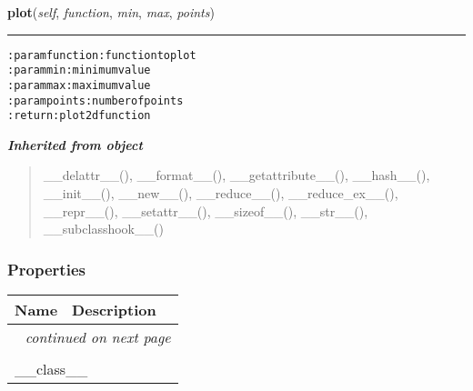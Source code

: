     \label{hal:charts:plotter:Plot2d:plot}

    \vspace{0.5ex}

\hspace{.8\funcindent}\begin{boxedminipage}{\funcwidth}

    \raggedright \textbf{plot}(\textit{self}, \textit{function}, \textit{min}, \textit{max}, \textit{points})

    \vspace{-1.5ex}

    \rule{\textwidth}{0.5\fboxrule}
\setlength{\parskip}{2ex}
\begin{alltt}

:param function: function to plot
:param min: minimum value
:param max: maximum value
:param points: number of points
:return: plot 2d function
\end{alltt}

\setlength{\parskip}{1ex}
    \end{boxedminipage}


\large{\textbf{\textit{Inherited from object}}}

\begin{quote}
\_\_delattr\_\_(), \_\_format\_\_(), \_\_getattribute\_\_(), \_\_hash\_\_(), \_\_init\_\_(), \_\_new\_\_(), \_\_reduce\_\_(), \_\_reduce\_ex\_\_(), \_\_repr\_\_(), \_\_setattr\_\_(), \_\_sizeof\_\_(), \_\_str\_\_(), \_\_subclasshook\_\_()
\end{quote}


  \subsubsection{Properties}

    \vspace{-1cm}
\hspace{\varindent}\begin{longtable}{|p{\varnamewidth}|p{\vardescrwidth}|l}
\cline{1-2}
\cline{1-2} \centering \textbf{Name} & \centering \textbf{Description}& \\
\cline{1-2}
\endhead\cline{1-2}\multicolumn{3}{r}{\small\textit{continued on next page}}\\\endfoot\cline{1-2}
\endlastfoot\multicolumn{2}{|l|}{\textit{Inherited from object}}\\
\multicolumn{2}{|p{\varwidth}|}{\raggedright \_\_class\_\_}\\
\cline{1-2}
\end{longtable}

